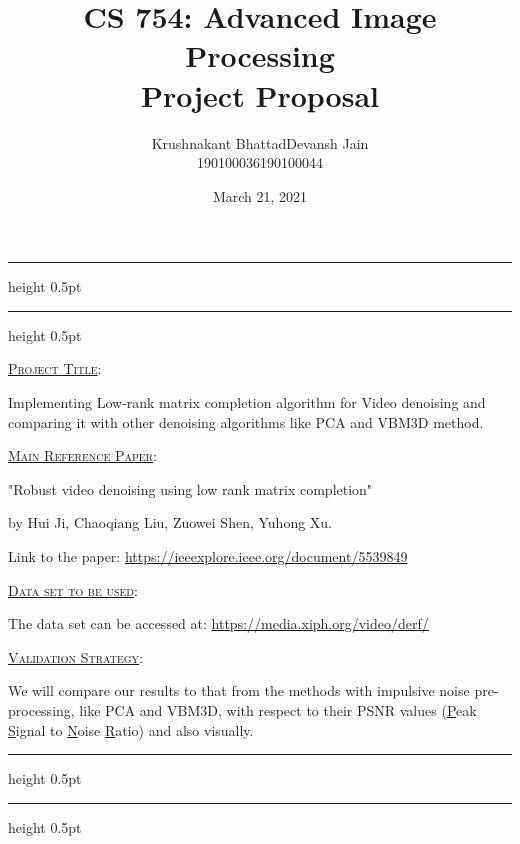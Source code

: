 \documentclass[fleqn, 11pt]{article}
\title{CS 754: Advanced Image Processing \\ Project Proposal}
\author{ 
\begin{tabular}{|c|c|}
     \hline
     \textsf{Krushnakant Bhattad} & \textsf{ \hspace{5pt} Devansh Jain \hspace{5pt} } \\
     \hline
     \textsf{190100036} & \textsf{190100044}\\
     \hline
\end{tabular}
}
\date{March 21, 2021}
\newcommand{\myline}{\par
  \kern3pt %
  \hrule height 0.5pt
  \kern2pt %
  \hrule height 0.5pt
  \kern3pt %
}
\begin{document}
\maketitle
\thispagestyle{empty}

\myline 

\vspace{20pt}


\underline{\large {\textsc{Project Title}}}: 

\medskip  

Implementing Low-rank matrix completion algorithm for Video denoising 
and comparing it with other 
denoising algorithms like PCA and VBM3D method. 

\hrulefill 

\vspace{10pt}

\underline{\large {\textsc{Main Reference Paper}}}: 

\medskip 

"Robust video denoising using low rank matrix completion"

by Hui Ji, Chaoqiang Liu, Zuowei Shen, Yuhong Xu.

Link to the paper: \url{https://ieeexplore.ieee.org/document/5539849}

\hrulefill

\vspace{10pt}

\underline{\large {\textsc{Data set to be used}}}: 

\medskip 

The data set can be accessed at: \url{https://media.xiph.org/video/derf/}

\hrulefill

\vspace{10pt}

\underline{\large {\textsc{Validation Strategy}}}: 

\medskip 

We will compare our results to that from the methods with impulsive noise pre-processing, like 
PCA and VBM3D, with respect to their PSNR values (\underline{P}eak \underline{S}ignal to \underline{N}oise \underline{R}atio) and also visually. 

\vspace{7pt}

\myline 
\end{document}

